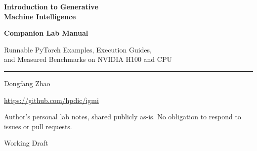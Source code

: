 \documentclass[11pt, oneside]{book}
\begin{document}
\frontmatter
\hypersetup{pageanchor=false}
\begin{titlepage}
    \vspace*{2.2cm}
    {\sffamily\Huge\bfseries\color{igmi-accent} Introduction to Generative\\Machine Intelligence\par}
    \vspace{0.5cm}
    {\sffamily\LARGE\bfseries\color{igmi-muted} Companion Lab Manual\par}
    \vspace{0.6cm}
    {\sffamily\large\color{igmi-muted} Runnable PyTorch Examples, Execution Guides,\\and Measured Benchmarks on NVIDIA H100 and CPU\par}
    \vspace{1.2cm}
    {\color{igmi-rule}\rule{\linewidth}{0.8pt}}
    \vspace{1.2cm}
    {\sffamily\large Dongfang Zhao\par}
    \vspace{0.2cm}
    {\sffamily\normalsize\color{igmi-muted} \par}
    \vspace{0.15cm}
    {\sffamily\normalsize\color{igmi-muted} \url{https://github.com/hpdic/igmi}\par}
    \vfill
    {\sffamily\footnotesize\color{igmi-muted} Author's personal lab notes, shared publicly as-is. No obligation to respond to issues or pull requests.\par}
    \vspace{0.25cm}
    {\sffamily\small\color{igmi-muted} Working Draft\par}
\end{titlepage}
\hypersetup{pageanchor=true}

\tableofcontents

\mainmatter


% 
% 
\end{document}
